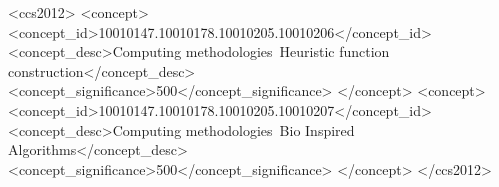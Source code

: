 \documentclass[sigconf]{acmart}
\begin{document}
%
%
\begin{CCSXML}
<ccs2012>
<concept>
<concept_id>10010147.10010178.10010205.10010206</concept_id>
<concept_desc>Computing methodologies~Heuristic function construction</concept_desc>
<concept_significance>500</concept_significance>
</concept>
<concept>
<concept_id>10010147.10010178.10010205.10010207</concept_id>
<concept_desc>Computing methodologies~Bio Inspired Algorithms</concept_desc>
<concept_significance>500</concept_significance>
</concept>
</ccs2012>
\end{CCSXML}



\maketitle




 
\end{document}
